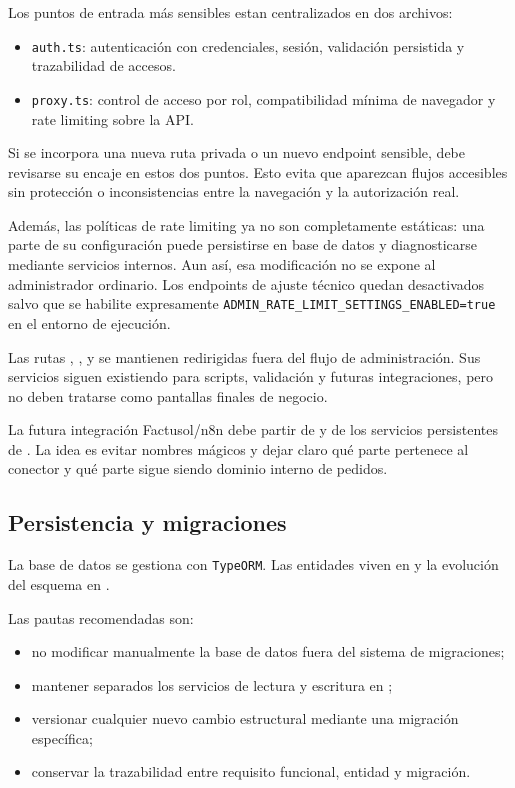 Los puntos de entrada más sensibles estan centralizados en dos archivos:

\begin{itemize}
    \item \texttt{auth.ts}: autenticación con credenciales, sesión, validación persistida y trazabilidad de accesos.
    \item \texttt{proxy.ts}: control de acceso por rol, compatibilidad mínima de navegador y rate limiting sobre la API.
\end{itemize}

Si se incorpora una nueva ruta privada o un nuevo endpoint sensible, debe revisarse su encaje en estos dos puntos. Esto evita que aparezcan flujos accesibles sin protección o inconsistencias entre la navegación y la autorización real.

Además, las políticas de rate limiting ya no son completamente estáticas: una parte de su configuración puede persistirse en base de datos y diagnosticarse mediante servicios internos. Aun así, esa modificación no se expone al administrador ordinario. Los endpoints de ajuste técnico quedan desactivados salvo que se habilite expresamente \texttt{ADMIN\_RATE\_LIMIT\_SETTINGS\_ENABLED=true} en el entorno de ejecución.

Las rutas , ,  y  se mantienen redirigidas fuera del flujo de administración. Sus servicios siguen existiendo para scripts, validación y futuras integraciones, pero no deben tratarse como pantallas finales de negocio.

La futura integración Factusol/n8n debe partir de  y de los servicios persistentes de . La idea es evitar nombres mágicos y dejar claro qué parte pertenece al conector y qué parte sigue siendo dominio interno de pedidos.

\subsection{Persistencia y migraciones}

La base de datos se gestiona con \texttt{TypeORM}. Las entidades viven en  y la evolución del esquema en .

Las pautas recomendadas son:

\begin{itemize}
    \item no modificar manualmente la base de datos fuera del sistema de migraciones;
    \item mantener separados los servicios de lectura y escritura en ;
    \item versionar cualquier nuevo cambio estructural mediante una migración específica;
    \item conservar la trazabilidad entre requisito funcional, entidad y migración.
\end{itemize}

